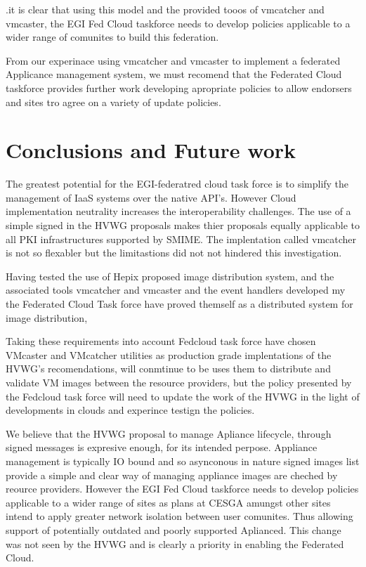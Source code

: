 \documentclass{llncs_Ibergrid2013}
\begin{document}
.it is clear that using this model and the provided tooos of vmcatcher and vmcaster, the EGI Fed Cloud taskforce needs to develop policies applicable to a wider range of comunites to build this federation.

From our experinace using vmcatcher and vmcaster to implement a federated Applicance management system, we must recomend that the Federated Cloud taskforce provides further work developing apropriate policies to allow endorsers and sites tro agree on a variety of update policies. 

\section{Conclusions and Future work}
\label{sect-conclusions}
The greatest potential for the EGI-federatred cloud task force is to simplify the management of IaaS systems over the native API's.
However Cloud implementation neutrality increases the interoperability challenges. The use of a simple signed in the HVWG proposals makes thier proposals equally applicable to all PKI infrastructures supported by SMIME. The implentation called vmcatcher is not so flexabler but the limitastions did not not hindered this investigation.

Having tested the use of Hepix proposed image distribution system, and the associated tools vmcatcher and vmcaster and the event handlers developed my the Federated Cloud Task force have proved themself as a distributed system for image distribution, 

Taking these requirements into account Fedcloud task force have chosen VMcaster and VMcatcher utilities as production grade implentations of the HVWG's recomendations, will conmtinue to be uses them to distribute and validate VM images between the resource providers, but the policy presented by the Fedcloud task force will need to update the work of the HVWG in the light of developments in clouds and experince testign the policies.

We believe that the HVWG proposal to manage Apliance lifecycle, through signed messages is expresive enough, for its intended perpose. Appliance management is typically IO bound and so asynconous in nature signed images list provide a simple and clear way of managing appliance images are cheched by reource providers. However the EGI Fed Cloud taskforce needs to develop policies applicable to a wider range of sites as plans at CESGA amungst other sites intend to apply greater network isolation between user comunites. Thus allowing support of potentially outdated and poorly supported Aplianced. This change was not seen by the HVWG and is clearly a priority in enabling the Federated Cloud.
\end{document}
